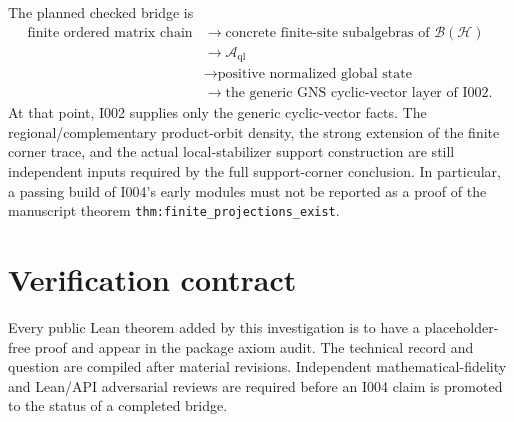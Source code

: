 \documentclass[11pt,reqno]{amsart}
\numberwithin{equation}{section}
\theoremstyle{definition}
\theoremstyle{remark}
\newcommand{\cA}{\mathcal A}
\newcommand{\cH}{\mathcal H}
\newcommand{\cB}{\mathcal B}
\begin{document}
The planned checked bridge is
\begin{equation}
  \begin{aligned}
    \text{finite ordered matrix chain}
    &\longrightarrow \text{concrete finite-site subalgebras of }\cB(\cH) \\
    &\longrightarrow \cA_{\mathrm{ql}} \\
    &\longrightarrow \text{positive normalized global state} \\
    &\longrightarrow \text{the generic GNS cyclic-vector layer of I002}.
  \end{aligned}
  \label{eq:planned_bridge}
\end{equation}
At that point, I002 supplies only the generic cyclic-vector facts.  The
regional/complementary product-orbit density, the strong extension of the
finite corner trace, and the actual local-stabilizer support construction are
still independent inputs required by the full support-corner conclusion.  In
particular, a passing build of I004's early modules must not be reported as a
proof of the manuscript theorem
\texttt{thm:finite\_projections\_exist}.

\section{Verification contract}
\label{sec:verification_contract}

Every public Lean theorem added by this investigation is to have a
placeholder-free proof and appear in the package axiom audit.  The technical
record and question are compiled after material revisions.  Independent
mathematical-fidelity and Lean/API adversarial reviews are required before an
I004 claim is promoted to the status of a completed bridge.
\end{document}
